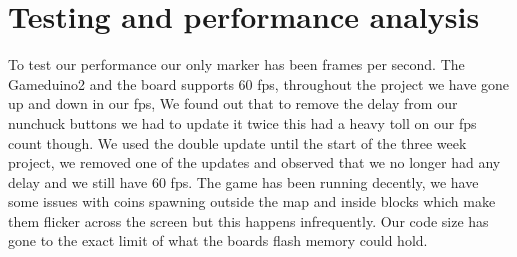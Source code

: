 \chapter{Testing and performance analysis}

To test our performance our only marker has been frames per second. The Gameduino2 and the board supports 60 fps, throughout the project we have gone up and down in our fps, We found out that to remove the delay from our nunchuck buttons we had to update it twice this had a heavy toll on our fps count though. We used the double update until the start of the three week project, we removed one of the updates and observed that we no longer had any delay and we still have 60 fps. The game has been running decently, we have some issues with coins spawning outside the map and inside blocks which make them flicker across the screen but this happens infrequently. Our code size has gone to the exact limit of what the boards flash memory could hold.